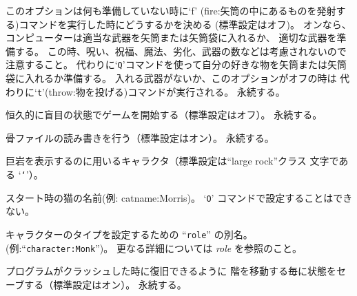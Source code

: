 このオプションは何も準備していない時に`f'
(fire:矢筒の中にあるものを発射する)コマンドを実行した時にどうするかを決める
(標準設定はオフ)。
オンなら、コンピューターは適当な武器を矢筒または矢筒袋に入れるか、
適切な武器を準備する。
この時、呪い、祝福、魔法、劣化、武器の数などは考慮されないので注意すること。
代わりに`{\tt Q}'コマンドを使って自分の好きな物を矢筒または矢筒袋に入れるか準備する。
入れる武器がないか、このオプションがオフの時は
代わりに`{\tt t}'(throw:物を投げる)コマンドが実行される。
永続する。
\item[\ib{blind}]
恒久的に盲目の状態でゲームを開始する（標準設定はオフ）。
永続する。
\item[\ib{bones}]
骨ファイルの読み書きを行う（標準設定はオン）。
永続する。
\item[\ib{boulder}]
巨岩を表示するのに用いるキャラクタ（標準設定は``large rock''クラス
文字である `{\tt `}'）。
\item[\ib{catname}]
スタート時の猫の名前(例: catname:Morris)。
`{\tt O}' コマンドで設定することはできない。
\item[\ib{character}]
キャラクターのタイプを設定するための ``{\tt role}'' の別名。
(例:``{\tt character:Monk}'')。
更なる詳細については {\it role\/} を参照のこと。
\item[\ib{checkpoint}]
プログラムがクラッシュした時に復旧できるように
階を移動する毎に状態をセーブする（標準設定はオン）。
永続する。
\item[\ib{checkspace}]
